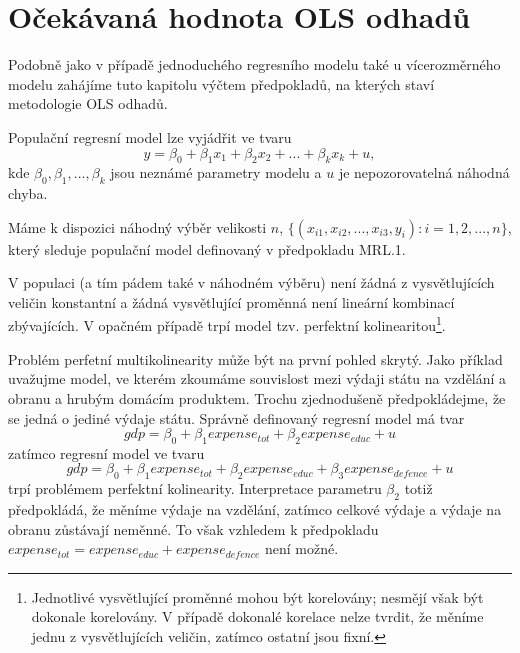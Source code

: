 \section{Očekávaná hodnota OLS odhadů}

Podobně jako v případě jednoduchého regresního modelu také u vícerozměrného modelu zahájíme tuto kapitolu 
výčtem předpokladů, na kterých staví metodologie OLS odhadů.

\begin{assumption}
Populační regresní model lze vyjádřit ve tvaru
\begin{equation}
y = \beta_0 + \beta_1 x_1 + \beta_2 x_2 + ... + \beta_k x_k + u,
\end{equation}
kde $\beta_0, \beta_1, ..., \beta_k$ jsou neznámé parametry modelu a $u$ je nepozorovatelná náhodná chyba.

\raggedleft{$\clubsuit$}
\end{assumption}

\begin{assumption}
Máme k dispozici náhodný výběr velikosti $n$, $\{(x_{i1}, x_{i2}, ..., x_{i3}, y_i): i = 1, 2, ..., n\}$, který 
sleduje populační model definovaný v předpokladu MRL.1.

\raggedleft{$\clubsuit$}
\end{assumption}

\begin{assumption}
V populaci (a tím pádem také v náhodném výběru) není žádná z vysvětlujících veličin konstantní a 
žádná vysvětlující proměnná není lineární kombinací zbývajících. V opačném případě trpí model tzv. 
perfektní kolinearitou\footnote{Jednotlivé vysvětlující proměnné mohou být korelovány; nesmějí však být 
dokonale korelovány. V případě dokonalé korelace nelze tvrdit, že měníme jednu z vysvětlujících veličin, 
zatímco ostatní jsou fixní.}.

\raggedleft{$\clubsuit$}
\end{assumption}

Problém perfetní multikolinearity může být na první pohled skrytý. Jako příklad uvažujme model, ve 
kterém zkoumáme souvislost mezi výdaji státu na vzdělání a obranu a hrubým domácím produktem. Trochu 
zjednodušeně předpokládejme, že se jedná o jediné výdaje státu. Správně definovaný regresní model má tvar
\begin{equation}
gdp = \beta_0 + \beta_1 expense_{tot} + \beta_2 expense_{educ} + u
\end{equation}
zatímco regresní model ve tvaru
\begin{equation}
gdp = \beta_0 + \beta_1 expense_{tot} + \beta_2 expense_{educ} + \beta_3 expense_{defence} + u
\end{equation}
trpí problémem perfektní kolinearity. Interpretace parametru $\beta_2$ totiž předpokládá, že měníme výdaje 
na vzdělání, zatímco celkové výdaje a výdaje na obranu zůstávají neměnné. To však vzhledem k 
předpokladu $expense_{tot} = expense_{educ} + expense_{defence}$ není možné.

